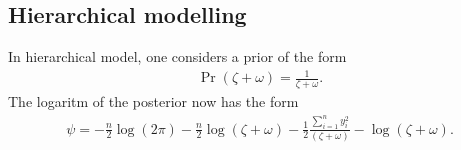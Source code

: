 \documentclass[11pt,twoside,a4paper]{article}
\begin{document}
\subsection{Hierarchical modelling}
  In hierarchical model, one considers a prior of the form
  \begin{align}
    \Pr(\zeta + \omega) = \frac{1}{\zeta + \omega}.
  \end{align}
  The logaritm of the posterior now has the form
  \begin{align}
    \psi  = - \frac{n}{2} \log (2 \pi) - \frac{n}{2} \log (\zeta + \omega)
      - \frac{1}{2} \frac{\sum_{i=1}^n y_i^2}{(\zeta + \omega)}
      - \log(\zeta + \omega).
  \end{align}
\end{document}
